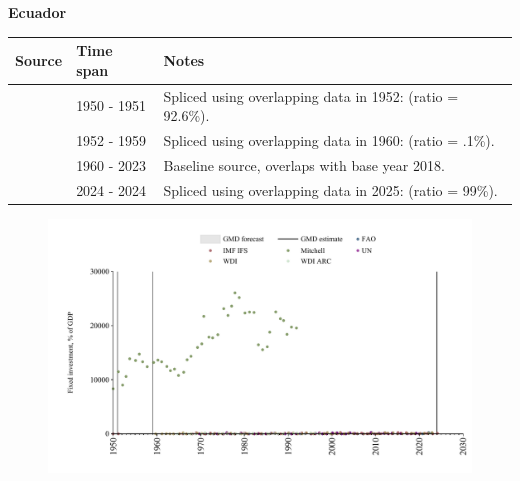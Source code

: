 \documentclass[12pt,a4paper,landscape]{article}
\begin{document}
\begin{adjustbox}{max totalsize={\paperwidth}{\paperheight},center}
\begin{minipage}[t][\textheight][t]{\textwidth}
\vspace*{0.5cm}
{}
\begin{center}
{\Large\bfseries Ecuador}
\end{center}
\vspace{0.5cm}
\begin{table}[H]
\centering
\small
\begin{tabular}{|l|l|l|}
\hline
\textbf{Source} & \textbf{Time span} & \textbf{Notes} \\
\hline
\rowcolor{white}\cite{IMF_IFS}& 1950 - 1951 &Spliced using overlapping data in 1952: (ratio = 92.6\%).\\
\rowcolor{lightgray}\cite{Mitchell}& 1952 - 1959 &Spliced using overlapping data in 1960: (ratio = .1\%).\\
\rowcolor{white}\cite{WDI}& 1960 - 2023 &Baseline source, overlaps with base year 2018.\\
\rowcolor{lightgray}\cite{IMF_IFS}& 2024 - 2024 &Spliced using overlapping data in 2025: (ratio = 99\%).\\
\hline
\end{tabular}
\end{table}
\begin{figure}[H]
\centering
\includegraphics[width=\textwidth,height=0.6\textheight,keepaspectratio]{graphs/ECU_finv_GDP.pdf}
\end{figure}
\end{minipage}
\end{adjustbox}
\end{document}

